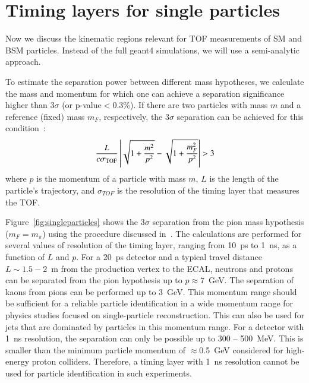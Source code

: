 \section{Timing layers for single particles}

Now we discuss the kinematic regions  relevant for  TOF measurements of SM and BSM particles. Instead of the full {\sc geant}4 simulations, we will
use a semi-analytic approach.  
 
To estimate the separation power between different mass hypotheses, we calculate the mass and momentum for which one can achieve a separation 
 significance higher than $3\sigma$ (or p-value$<0.3$\%). 
If there are two particles with mass $m$ and a reference (fixed) mass $m_F$, respectively, the $3\sigma$ separation can be 
achieved for this condition~\cite{Cerri:2018rkm}:
\begin{equation}
\frac{L}{c \sigma_{\textsc{TOF}}}\left|\sqrt{1+\frac{m^2}{p^2}} - \sqrt{1+\frac{m_F^2}{p^2}}\right| > 3
\label{eqTOF}
\end{equation}
where $p$ is the momentum of a particle with mass $m$, $L$  is the length of the particle's trajectory, 
and $\sigma_{TOF}$ is the
resolution  of the timing layer that measures the TOF.

Figure~\ref{fig:singleparticles} shows the $3\sigma$ separation from the pion
mass hypothesis ($m_F=m_{\pi}$) using the procedure discussed  in~\cite{Cerri:2018rkm}. The 
calculations are performed for several values of resolution of the timing layer, ranging from 10~ps to 1~ns,
as a function of $L$ and $p$. For a 20~ps detector and a typical travel 
distance $L\sim 1.5-2$~m from the production vertex to the ECAL, neutrons and protons can be separated from the pion hypothesis up to $p \approx 7$~GeV. 
The separation of kaons from pions can be performed up to 3~GeV.
This momentum range should be sufficient for a reliable particle identification in a wide momentum range 
for physics studies focused on single-particle reconstruction. This can also be used for jets that are dominated
by particles in this momentum range.
For a detector  with 1~ns resolution, the separation can only be possible  up to  300 -- 500~MeV. This is smaller than the 
minimum particle momentum of $\approx$0.5~GeV considered for high-energy proton colliders.
Therefore, a timing layer with 1~ns resolution cannot be used for particle identification in such experiments.

